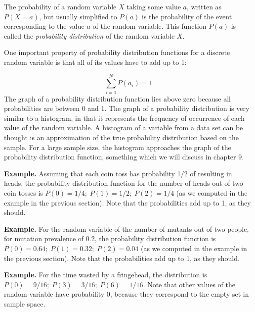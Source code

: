 \documentclass[
  letterpaper,
  DIV=11,
  numbers=noendperiod]{scrreprt}
\begin{document}
\begin{tcolorbox}[enhanced jigsaw, coltitle=black, arc=.35mm, opacitybacktitle=0.6, breakable, bottomtitle=1mm, toptitle=1mm, titlerule=0mm, colback=white, leftrule=.75mm, rightrule=.15mm, colframe=quarto-callout-note-color-frame, colbacktitle=quarto-callout-note-color!10!white, opacityback=0, title=\textcolor{quarto-callout-note-color}{\faInfo}\hspace{0.5em}{Definition}, left=2mm, toprule=.15mm, bottomrule=.15mm]

The probability of a random variable \(X\) taking some value \(a\),
written as \(P(X=a)\), but usually simplified to \(P(a)\) is the
probability of the event corresponding to the value \(a\) of the random
variable. This function \(P(a)\) is called the \emph{probability
distribution} of the random variable \(X\).

\end{tcolorbox}

One important property of probability distribution functions for a
discrete random variable is that all of its values have to add up to 1:

\[\sum_{i=1}^N P(a_i) =1\] The graph of a probability distribution
function lies above zero because all probabilities are between 0 and 1.
The graph of a probability distribution is very similar to a histogram,
in that it represents the frequency of occurrence of each value of the
random variable. A histogram of a variable from a data set can be
thought is an approximation of the true probability distribution based
on the sample. For a large sample size, the histogram approaches the
graph of the probability distribution function, something which we will
discuss in chapter 9.

\textbf{Example.} Assuming that each coin toss has probability 1/2 of
resulting in heads, the probability distribution function for the number
of heads out of two coin tosses is
\(P(0) = 1/4; \; P(1) = 1/2; \; P(2) = 1/4\) (as we computed in the
example in the previous section). Note that the probabilities add up to
1, as they should.

\textbf{Example.} For the random variable of the number of mutants out
of two people, for mutation prevalence of 0.2, the probability
distribution function is \(P(0) = 0.64; \; P(1) = 0.32; \; P(2) = 0.04\)
(as we computed in the example in the previous section). Note that the
probabilities add up to 1, as they should.

\textbf{Example.} For the time wasted by a fringehead, the distribution
is \(P(0)= 9/16; \; P(3) = 3/16; \; P(6) = 1/16\). Note that other
values of the random variable have probability 0, because they
correspond to the empty set in sample space.
\end{document}
